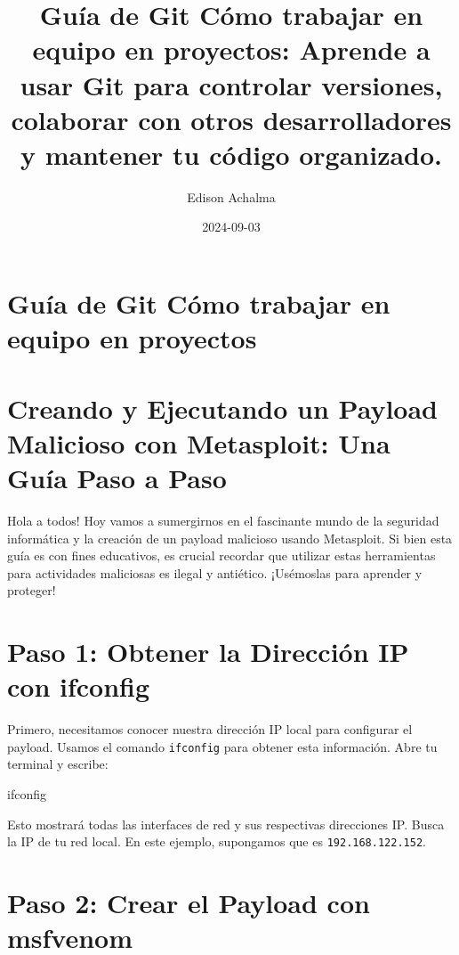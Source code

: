 \documentclass[
  jou,
  floatsintext,
  longtable,
  a4paper,
  nolmodern,
  notxfonts,
  notimes,
  colorlinks=true,linkcolor=blue,citecolor=blue,urlcolor=blue]{apa7}
\title{Guía de Git Cómo trabajar en equipo en proyectos: Aprende a usar
Git para controlar versiones, colaborar con otros desarrolladores y
mantener tu código organizado.}
\author{Edison Achalma}
\affiliation{
{Escuela Profesional de Economía, Universidad Nacional de San Cristóbal
de Huamanga}}
\date{2024-09-03}
\newenvironment{Shaded}{\begin{snugshade}}{\end{snugshade}}
\newcommand{\ExtensionTok}[1]{\textcolor[rgb]{0.00,0.23,0.31}{#1}}
\begin{document}
\maketitle

\hypertarget{toc}{}
\tableofcontents
\newpage
\section[Introduction]{Guía de Git Cómo trabajar en equipo en proyectos}

\setcounter{secnumdepth}{5}

\setlength\LTleft{0pt}


\section{Creando y Ejecutando un Payload Malicioso con Metasploit: Una
Guía Paso a
Paso}\label{creando-y-ejecutando-un-payload-malicioso-con-metasploit-una-guuxeda-paso-a-paso}

Hola a todos! Hoy vamos a sumergirnos en el fascinante mundo de la
seguridad informática y la creación de un payload malicioso usando
Metasploit. Si bien esta guía es con fines educativos, es crucial
recordar que utilizar estas herramientas para actividades maliciosas es
ilegal y antiético. ¡Usémoslas para aprender y proteger!

\section{Paso 1: Obtener la Dirección IP con
ifconfig}\label{paso-1-obtener-la-direcciuxf3n-ip-con-ifconfig}

Primero, necesitamos conocer nuestra dirección IP local para configurar
el payload. Usamos el comando \texttt{ifconfig} para obtener esta
información. Abre tu terminal y escribe:

\begin{Shaded}
\begin{Highlighting}[]
\ExtensionTok{ifconfig}
\end{Highlighting}
\end{Shaded}

Esto mostrará todas las interfaces de red y sus respectivas direcciones
IP. Busca la IP de tu red local. En este ejemplo, supongamos que es
\texttt{192.168.122.152}.

\section{Paso 2: Crear el Payload con
msfvenom}\label{paso-2-crear-el-payload-con-msfvenom}
\end{document}
